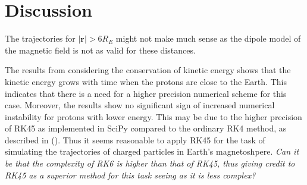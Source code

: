 \section{Discussion}
The trajectories for $|\bm{r}| > 6R_E$ might not make much sense as the dipole model of the magnetic field is not as valid for these distances.

The results from considering the conservation of kinetic energy shows that the kinetic energy grows with time when the protons are close to the Earth. 
This indicates that there is a need for a higher precision numerical scheme for this case.
Moreover, the results show no significant sign of increased numerical instability for protons with lower energy. 
This may be due to the higher precision of RK45 as implemented in SciPy compared to the ordinary RK4 method, as described in (\cite{DORMAND198019}).
Thus it seems reasonable to apply RK45 for the task of simulating the trajectories of charged particles in Earth's magnetoshpere. 
\textit{Can it be that the complexity of RK6 is higher than that of RK45, thus giving credit to RK45 as a superior method for this task seeing as it is less complex?}

